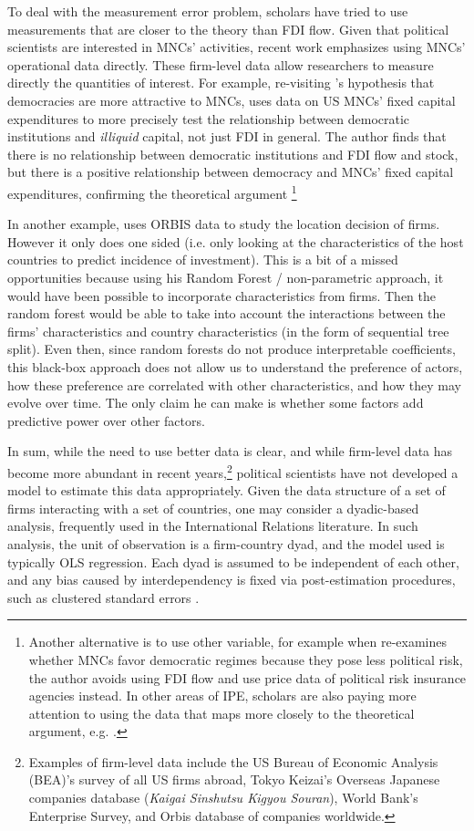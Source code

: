 To deal with the measurement error problem, scholars have tried to use
measurements that are closer to the theory than FDI flow. Given that political
scientists are interested in MNCs' activities, recent work emphasizes using
MNCs' operational data directly. These firm-level data allow researchers to
measure directly the quantities of interest. For example, re-visiting
\citet{Li2009a}'s hypothesis that democracies are more attractive to MNCs,
\citet{Kerner2014} uses data on US MNCs' fixed capital expenditures to more
precisely test the relationship between democratic institutions and
\textit{illiquid} capital, not just FDI in general. The author finds that there
is no relationship between democratic institutions and FDI flow and stock, but
there is a positive relationship between democracy and MNCs' fixed capital
expenditures, confirming the theoretical argument \footnote{Another alternative
is to use other variable, for example when \citet{Jensen2008} re-examines
whether MNCs favor democratic regimes because they pose less political risk, the
author avoids using FDI flow and use price data of political risk insurance
agencies instead. In other areas of IPE, scholars are also paying more attention
to using the data that maps more closely to the theoretical argument, e.g.
\citep{Karcher2013}.}

In another example, \citet{Arel-Bundock2017} uses ORBIS data to study the location decision of
firms. However it only does one sided (i.e. only looking at the characteristics
of the host countries to predict incidence of investment). This is a bit of a
missed opportunities because using his Random Forest / non-parametric approach,
it would have been possible to incorporate characteristics from firms. Then the
random forest would be able to take into account the interactions between the
firms' characteristics and country characteristics (in the form of sequential
tree split). Even then, since random forests do not produce interpretable
coefficients, this black-box approach does not allow us to understand the
preference of actors, how these preference are correlated with other
characteristics, and how they may evolve over time. The only claim he can make
is whether some factors add predictive power over other factors.

In sum, while the need to use better data is clear, and while firm-level data has become more abundant in recent
years,\footnote{Examples of firm-level data include the US Bureau of Economic
Analysis (BEA)'s survey of all US firms abroad, Tokyo Keizai's Overseas Japanese
companies database (\textit{Kaigai Sinshutsu Kigyou Souran}), World Bank's
Enterprise Survey, and Orbis database of companies worldwide.} political
scientists have not developed a model to estimate this data appropriately. Given the data structure of a
set of firms interacting with a set of countries, one may consider a
dyadic-based analysis, frequently used in the International Relations
literature. In such analysis, the unit of observation is a firm-country dyad,
and the model used is typically OLS regression. Each dyad is assumed to be
independent of each other, and any bias caused by interdependency is fixed via
post-estimation procedures, such as clustered standard errors \citep{Dorff2013}.

